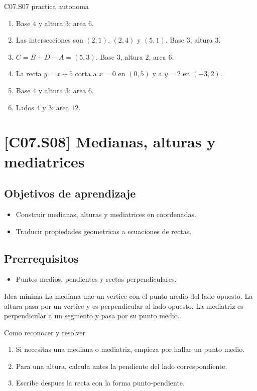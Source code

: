 \begin{fullsolution}{C07.S07 practica autonoma}
\begin{enumerate}[label=\textbf{PX-C07.S07-\arabic*:}, leftmargin=*]
  \item Base \(4\) y altura \(3\): area \(6\).
  \item Las intersecciones son \((2,1)\), \((2,4)\) y \((5,1)\). Base \(3\), altura \(3\).
  \item \(C=B+D-A=(5,3)\). Base \(3\), altura \(2\), area \(6\).
  \item La recta \(y=x+5\) corta a \(x=0\) en \((0,5)\) y a \(y=2\) en \((-3,2)\).
  \item Base \(4\) y altura \(3\): area \(6\).
  \item Lados \(4\) y \(3\): area \(12\).
\end{enumerate}
\end{fullsolution}

\section{[C07.S08] Medianas, alturas y mediatrices}

\subsection*{Objetivos de aprendizaje}
\begin{itemize}
  \item Construir medianas, alturas y mediatrices en coordenadas.
  \item Traducir propiedades geometricas a ecuaciones de rectas.
\end{itemize}

\subsection*{Prerrequisitos}
\begin{itemize}
  \item Puntos medios, pendientes y rectas perpendiculares.
\end{itemize}

\begin{theorybox}{Idea minima}
La mediana une un vertice con el punto medio del lado opuesto. La altura pasa por un vertice y
es perpendicular al lado opuesto. La mediatriz es perpendicular a un segmento y pasa por su
punto medio.
\end{theorybox}

\begin{methodbox}{Como reconocer y resolver}
\begin{enumerate}
  \item Si necesitas una mediana o mediatriz, empieza por hallar un punto medio.
  \item Para una altura, calcula antes la pendiente del lado correspondiente.
  \item Escribe despues la recta con la forma punto-pendiente.
\end{enumerate}
\end{methodbox}

